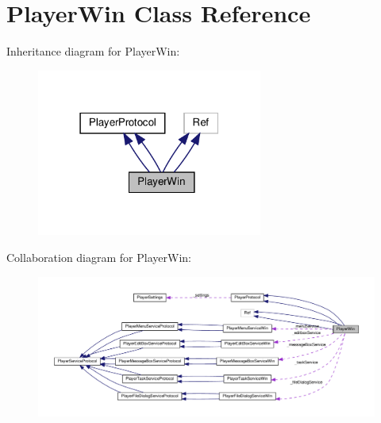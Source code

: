 \hypertarget{classPlayerWin}{}\section{Player\+Win Class Reference}
\label{classPlayerWin}


Inheritance diagram for Player\+Win\+:
\nopagebreak
\begin{figure}[H]
\begin{center}
\leavevmode
\includegraphics[width=210pt]{classPlayerWin__inherit__graph}
\end{center}
\end{figure}


Collaboration diagram for Player\+Win\+:
\nopagebreak
\begin{figure}[H]
\begin{center}
\leavevmode
\includegraphics[width=350pt]{classPlayerWin__coll__graph}
\end{center}
\end{figure}
